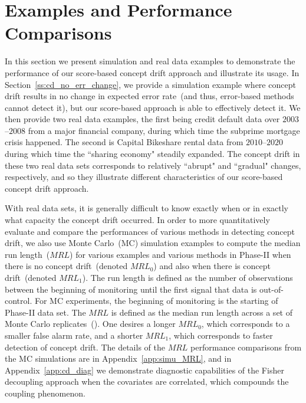 \documentclass[twoside,11pt]{article}
\begin{document}
\section{Examples and Performance Comparisons}
\label{s:real_data}
In this section we present simulation and real data examples to demonstrate the performance of our score-based concept drift approach and illustrate its usage. In Section~\ref{ss:cd_no_err_change}, we provide a simulation example where concept drift results in no change in expected error rate~(and thus, error-based methods cannot detect it), but our score-based approach is able to effectively detect it. We then provide two real data examples, the first being credit default data over $2003$--$2008$ from a major financial company, during which time the subprime mortgage crisis happened. The second is Capital Bikeshare rental data from $2010$--$2020$ during which time the ``sharing economy" steadily expanded. The concept drift in these two real data sets corresponds to relatively ``abrupt" and ``gradual" changes, respectively, and so they illustrate different characteristics of our score-based concept drift approach. 

With real data sets, it is generally difficult to know exactly when or in exactly what capacity the concept drift occurred. In order to more quantitatively evaluate and compare the performances of various methods in detecting concept drift, we also use Monte Carlo~(MC) simulation examples to compute the median run length~($MRL$) for various examples and various methods in Phase-II when there is no concept drift~(denoted $MRL_0$) and also when there is concept drift~(denoted $MRL_1$). The run length is defined as the number of observations between the beginning of monitoring until the first signal that data is out-of-control. For MC experiments, the beginning of monitoring is the starting of Phase-II data set. The $MRL$ is defined as the median run length across a set of Monte Carlo replicates~(\cite{montgomery2007introduction}). One desires a longer $MRL_0$, which corresponds to a smaller false alarm rate, and a shorter $MRL_1$, which corresponds to faster detection of concept drift. The details of the $MRL$ performance comparisons from the MC simulations are in Appendix~\ref{app:simu_MRL}, and in Appendix~\ref{app:cd_diag} we demonstrate diagnostic capabilities of the Fisher decoupling approach when the covariates are correlated, which compounds the coupling phenomenon. 
\end{document}
